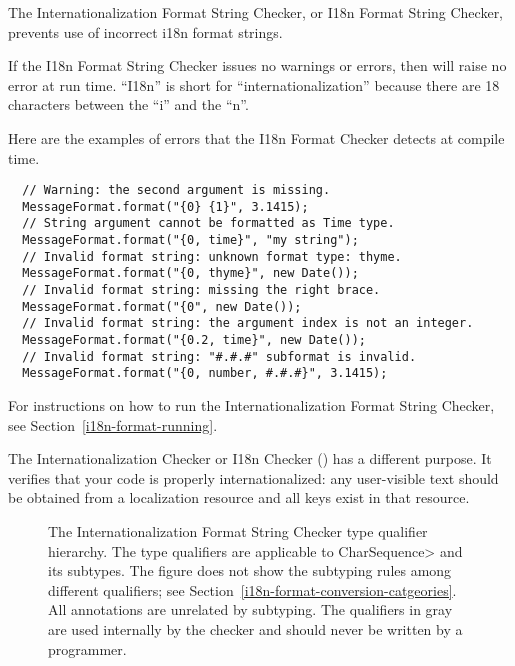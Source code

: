\htmlhr
{}

The Internationalization Format String Checker, or I18n Format String Checker,
prevents use of incorrect i18n format strings.

If the I18n Format String Checker issues no warnings or errors, then
will raise no error at run time.
``I18n'' is short for
``internationalization'' because there are 18 characters between the ``i'' and
the ``n''.

Here are the examples of errors that the
I18n Format Checker
detects at compile time.

\begin{Verbatim}
  // Warning: the second argument is missing.
  MessageFormat.format("{0} {1}", 3.1415);
  // String argument cannot be formatted as Time type.
  MessageFormat.format("{0, time}", "my string");
  // Invalid format string: unknown format type: thyme.
  MessageFormat.format("{0, thyme}", new Date());
  // Invalid format string: missing the right brace.
  MessageFormat.format("{0", new Date());
  // Invalid format string: the argument index is not an integer.
  MessageFormat.format("{0.2, time}", new Date());
  // Invalid format string: "#.#.#" subformat is invalid.
  MessageFormat.format("{0, number, #.#.#}", 3.1415);
\end{Verbatim}

For instructions on how to run the Internationalization Format String
Checker, see Section~\ref{i18n-format-running}.

The Internationalization Checker or I18n Checker ()
has a different purpose.  It verifies that your code is properly
internationalized: any user-visible text should be obtained from a
localization resource and all keys exist in that resource.




\begin{figure}
\caption{The
  Internationalization
  Format String Checker type qualifier hierarchy.
  The type qualifiers are applicable to \<CharSequence> and its subtypes.
  The figure does not show the subtyping rules among different
  qualifiers; see
  Section~\ref{i18n-format-conversion-catgeories}.
  All  annotations are unrelated by subtyping.
  The qualifiers in gray are used internally by
  the checker and should never be written by a programmer.
}
\label{i18n-format-type-hierarchy}
\end{figure}

